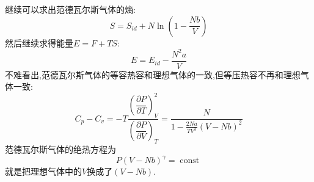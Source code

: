   继续可以求出范德瓦尔斯气体的熵:
  \begin{equation}
    S=S_{id}+N \ln(1-\frac{Nb}{V})
  \end{equation}
  然后继续求得能量$E=F+TS$:
  \begin{equation}
    E=E_{id}-\frac{N^{2}a}{V}
  \end{equation}
  不难看出,范德瓦尔斯气体的等容热容和理想气体的一致,但等压热容不再和理想气体一致:
  \begin{equation}
    C_{p}-C_{v}=-T \frac{ \left( \dfrac{\partial P}{\partial T} \right) ^{2}_{V}}{\left( \dfrac{\partial P}{\partial V} \right) _{T}}=\dfrac{N}{1-\frac{2Na}{TV^{3}}(V-Nb)^{2}}
  \end{equation}
  范德瓦尔斯气体的绝热方程为
  \begin{equation}
    P(V-Nb)^{\gamma}=\operatorname{const}
  \end{equation}
  就是把理想气体中的$V$换成了$(V-Nb)$. 



  
